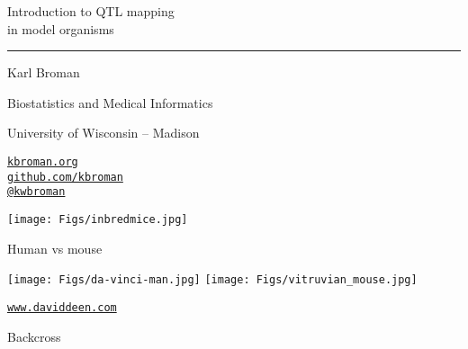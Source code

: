 \documentclass[12pt]{article}
\newcommand{\titlesize}{\fontsize{40}{50} \selectfont}
\newcommand{\headsize}{\fontsize{35}{35} \selectfont}
\newcommand{\textsize}{\fontsize{30}{35} \selectfont}
\newcommand{\smallsize}{\fontsize{25}{30} \selectfont}
\newcommand{\smallestsize}{\fontsize{18}{22} \selectfont}
\begin{document}
\thispagestyle{empty}

\begin{center}
\titlesize \color{myyellow}


\vspace*{15mm}

Introduction to QTL mapping \\
in model organisms

\color{mypink}
\rule{10in}{1mm}

\vspace{5mm}

\textsize \color{myblue}
Karl Broman
\vspace{5mm}

\color{mywhite}
{\smallsize Biostatistics and Medical Informatics

University of Wisconsin -- Madison
\vspace{20mm}


\href{http://kbroman.org}{\tt kbroman.org} \\[3pt]
\href{https://github.com/kbroman}{\tt github.com/kbroman} \\
\href{https://twitter.com/kwbroman}{\tt @kwbroman}
}

\end{center}

\newpage
\thispagestyle{empty}

\vspace*{-0.85in}

\centerline{\texttt{[image: Figs/inbredmice.jpg]}}


\newpage

\headsize \color{myyellow}
\hfill \begin{minipage}{5.75in}
\centering
Human vs mouse
\end{minipage}

\vspace{3cm}

\centerline{
\texttt{[image: Figs/da-vinci-man.jpg]}
\texttt{[image: Figs/vitruvian\_mouse.jpg]}
}

{\color{myblue} \smallestsize \hfill
  \href{http://www.daviddeen.com}{\tt www.daviddeen.com} \hspace*{11mm}}


\newpage

\headsize \color{myyellow}
\hfill \begin{minipage}{5.75in}
\centering
Backcross
\end{minipage}
\end{document}
